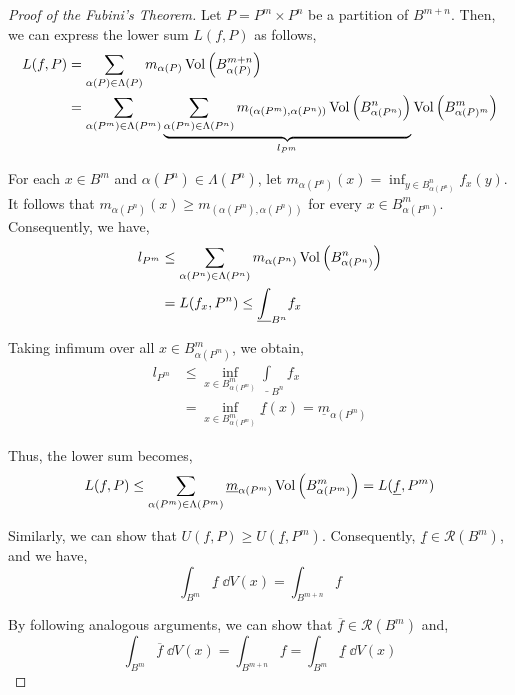 \documentclass[../Analysis-3.tex]{subfiles}
\begin{document}
\begin{proof}[Proof of the Fubini's Theorem]
  Let $P = P^m \times P^n$ be a partition of $B^{m+n}$. Then, we can express the lower sum $L(f,P)$ as follows,
  \begin{align*}
    L(f,P)
     & = \sum_{\alpha(P) \in \Lambda(P)} m_{\alpha(P)} \operatorname{Vol}\left( B_{\alpha(P)}^{m+n} \right)                                                                                                                        \\
     & = \sum_{\alpha(P^m) \in \Lambda(P^m)} \underbrace{\sum_{\alpha(P^n) \in \Lambda(P^n)} m_{(\alpha(P^m), \alpha(P^n))} \operatorname{Vol}\left( B_{\alpha(P^n)}^{n} \right)}_{l_{P^m}} \operatorname{Vol}\left( B_{\alpha(P)^m}^{m} \right)
  \end{align*}

  For each $x \in B^m$ and $\alpha(P^n) \in \Lambda(P^n)$, let $m_{\alpha(P^n)}(x) = \inf_{y \in B_{\alpha(P^n)}^n} f_x(y)$. It follows that $m_{\alpha(P^n)}(x) \geq m_{(\alpha(P^m), \alpha(P^n))}$ for every $x \in B_{\alpha(P^m)}^m$. Consequently, we have,
  \begin{align*}
    l_{P^m}
     & \leq \sum_{\alpha(P^n) \in \Lambda(P^n)} m_{\alpha(P^n)} \operatorname{Vol}\left( B_{\alpha(P^n)}^n \right) \\
     & = L(f_x, P^n) \leq \underline{\int}_{B^n} f_x                                                 \\
  \end{align*}

  Taking infimum over all $ x \in B_{\alpha(P^m)}^m $, we obtain,
  \begin{align*}
    l_{P^m}
     & \leq \inf_{x \in B_{\alpha(P^m)}^m} \underline{\int}_{B^n} f_x                  \\
     & = \inf_{x \in B_{\alpha(P^m)}^m} \underline{f}(x) = \underline{m}_{\alpha(P^m)}
  \end{align*}

  Thus, the lower sum becomes,
  \[  L(f,P) \leq \sum_{\alpha(P^m) \in \Lambda(P^m)} \underline{m}_{\alpha(P^m)} \operatorname{Vol}\left( B_{\alpha(P^m)}^m \right) = L(\underline{f},P^m)  \]

  Similarly, we can show that $U(f,P) \geq U(\underline{f},P^m)$. Consequently, $\underline{f} \in \mathscr{R}(B^m)$, and we have,
  \[  \int_{B^m} \underline{f} \; \dd{V(x)} = \int_{B^{m+n}} f  \]

  By following analogous arguments, we can show that $\overline{f} \in \mathscr{R}(B^m)$ and,
  \[  \int_{B^m} \overline{f} \; \dd{V(x)} = \int_{B^{m+n}} f = \int_{B^m} \underline{f} \; \dd{V(x)}  \]
\end{proof}
\end{document}
